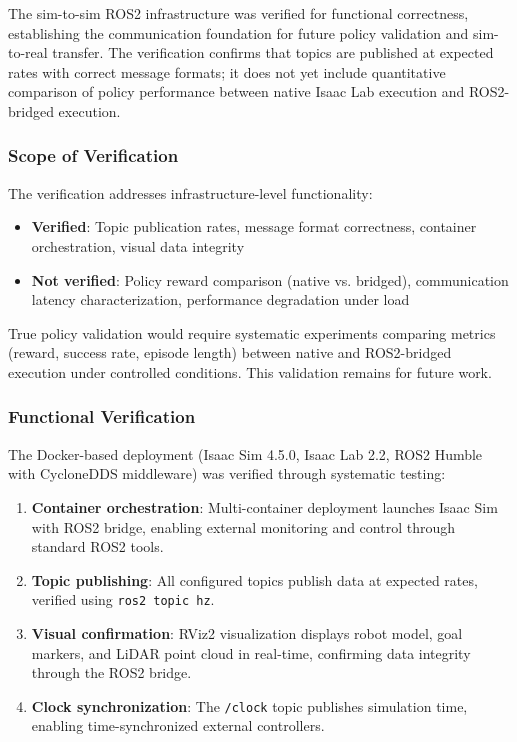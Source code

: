 \documentclass[12pt,a4paper]{article}
\begin{document}
The sim-to-sim ROS2 infrastructure was verified for functional correctness, establishing the communication foundation for future policy validation and sim-to-real transfer. The verification confirms that topics are published at expected rates with correct message formats; it does not yet include quantitative comparison of policy performance between native Isaac Lab execution and ROS2-bridged execution.

\subsubsection{Scope of Verification}

The verification addresses infrastructure-level functionality:
\begin{itemize}
    \item \textbf{Verified}: Topic publication rates, message format correctness, container orchestration, visual data integrity
    \item \textbf{Not verified}: Policy reward comparison (native vs. bridged), communication latency characterization, performance degradation under load
\end{itemize}

True policy validation would require systematic experiments comparing metrics (reward, success rate, episode length) between native and ROS2-bridged execution under controlled conditions. This validation remains for future work.

\subsubsection{Functional Verification}

The Docker-based deployment (Isaac Sim 4.5.0, Isaac Lab 2.2, ROS2 Humble with CycloneDDS middleware) was verified through systematic testing:

\begin{enumerate}
    \item \textbf{Container orchestration}: Multi-container deployment launches Isaac Sim with ROS2 bridge, enabling external monitoring and control through standard ROS2 tools.
    \item \textbf{Topic publishing}: All configured topics publish data at expected rates, verified using \texttt{ros2 topic hz}.
    \item \textbf{Visual confirmation}: RViz2 visualization displays robot model, goal markers, and LiDAR point cloud in real-time, confirming data integrity through the ROS2 bridge.
    \item \textbf{Clock synchronization}: The \texttt{/clock} topic publishes simulation time, enabling time-synchronized external controllers.
\end{enumerate}
\end{document}
